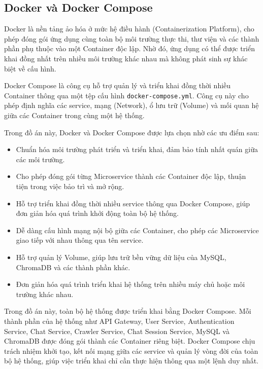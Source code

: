 \documentclass[../DoAn.tex]{subfiles}
\begin{document}
\subsection{Docker và Docker Compose}

Docker là nền tảng ảo hóa ở mức hệ điều hành (Containerization Platform), cho phép đóng gói ứng dụng cùng toàn bộ môi trường thực thi, thư viện và các thành phần phụ thuộc vào một Container độc lập. Nhờ đó, ứng dụng có thể được triển khai đồng nhất trên nhiều môi trường khác nhau mà không phát sinh sự khác biệt về cấu hình.

Docker Compose là công cụ hỗ trợ quản lý và triển khai đồng thời nhiều Container thông qua một tệp cấu hình \texttt{docker-compose.yml}. Công cụ này cho phép định nghĩa các service, mạng (Network), ổ lưu trữ (Volume) và mối quan hệ giữa các Container trong cùng một hệ thống.

Trong đồ án này, Docker và Docker Compose được lựa chọn nhờ các ưu điểm sau:

\begin{itemize}
    \item Chuẩn hóa môi trường phát triển và triển khai, đảm bảo tính nhất quán giữa các môi trường.

    \item Cho phép đóng gói từng Microservice thành các Container độc lập, thuận tiện trong việc bảo trì và mở rộng.

    \item Hỗ trợ triển khai đồng thời nhiều service thông qua Docker Compose, giúp đơn giản hóa quá trình khởi động toàn bộ hệ thống.

    \item Dễ dàng cấu hình mạng nội bộ giữa các Container, cho phép các Microservice giao tiếp với nhau thông qua tên service.

    \item Hỗ trợ quản lý Volume, giúp lưu trữ bền vững dữ liệu của MySQL, ChromaDB và các thành phần khác.

    \item Đơn giản hóa quá trình triển khai hệ thống trên nhiều máy chủ hoặc môi trường khác nhau.
\end{itemize}

Trong đồ án này, toàn bộ hệ thống được triển khai bằng Docker Compose. Mỗi thành phần của hệ thống như API Gateway, User Service, Authentication Service, Chat Service, Crawler Service, Chat Session Service, MySQL và ChromaDB được đóng gói thành các Container riêng biệt. Docker Compose chịu trách nhiệm khởi tạo, kết nối mạng giữa các service và quản lý vòng đời của toàn bộ hệ thống, giúp việc triển khai chỉ cần thực hiện thông qua một lệnh duy nhất.
\end{document}
